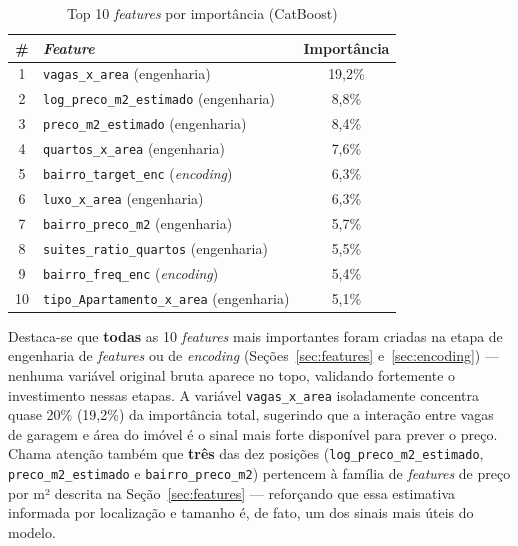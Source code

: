 \documentclass[12pt, a4paper]{article}
\newcommand{\code}[1]{\texttt{#1}}
\begin{document}
\begin{table}[H]
  \centering
  \caption{Top 10 \textit{features} por importância (CatBoost)}
  \label{tab:importance}
  \small{}
  \begin{tabular}{clc}
    \toprule
    \rowcolor{headerblue}
    \color{white}\textbf{\#} & \color{white}\textbf{\textit{Feature}} & \color{white}\textbf{Importância} \\
    \midrule
    1  & \code{vagas\_x\_area} (engenharia)              & 19,2\% \\
    2  & \code{log\_preco\_m2\_estimado} (engenharia)    & 8,8\% \\
    3  & \code{preco\_m2\_estimado} (engenharia)         & 8,4\% \\
    4  & \code{quartos\_x\_area} (engenharia)            & 7,6\% \\
    5  & \code{bairro\_target\_enc} (\textit{encoding})  & 6,3\% \\
    6  & \code{luxo\_x\_area} (engenharia)               & 6,3\% \\
    7  & \code{bairro\_preco\_m2} (engenharia)           & 5,7\% \\
    8  & \code{suites\_ratio\_quartos} (engenharia)      & 5,5\% \\
    9  & \code{bairro\_freq\_enc} (\textit{encoding})    & 5,4\% \\
    10 & \code{tipo\_Apartamento\_x\_area} (engenharia)  & 5,1\% \\
    \bottomrule
  \end{tabular}
\end{table}

Destaca-se que \textbf{todas} as 10 \textit{features} mais importantes foram criadas na etapa de engenharia de \textit{features} ou de \textit{encoding} (Seções~\ref{sec:features} e~\ref{sec:encoding}) --- nenhuma variável original bruta aparece no topo, validando fortemente o investimento nessas etapas. A variável \code{vagas\_x\_area} isoladamente concentra quase 20\% (19,2\%) da importância total, sugerindo que a interação entre vagas de garagem e área do imóvel é o sinal mais forte disponível para prever o preço. Chama atenção também que \textbf{três} das dez posições (\code{log\_preco\_m2\_estimado}, \code{preco\_m2\_estimado} e \code{bairro\_preco\_m2}) pertencem à família de \textit{features} de preço por m² descrita na Seção~\ref{sec:features} --- reforçando que essa estimativa informada por localização e tamanho é, de fato, um dos sinais mais úteis do modelo.
\end{document}
